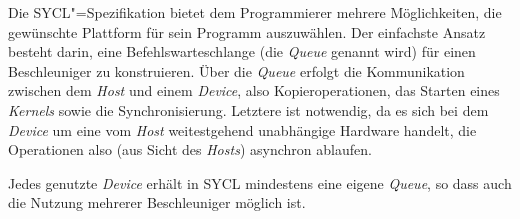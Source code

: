 Die SYCL"=Spezifikation bietet dem Programmierer mehrere Möglichkeiten, die
gewünschte Plattform für sein Programm auszuwählen. Der einfachste Ansatz
besteht darin, eine Befehlswarteschlange (die \textit{Queue} genannt wird) für
einen Beschleuniger zu konstruieren. Über die \textit{Queue} erfolgt die
Kommunikation zwischen dem \textit{Host} und einem \textit{Device}, also
Kopieroperationen, das Starten eines \textit{Kernels} sowie die
Synchronisierung. Letztere ist notwendig, da es sich bei dem \textit{Device}
um eine vom \textit{Host} weitestgehend unabhängige Hardware handelt, die
Operationen also (aus Sicht des \textit{Hosts}) asynchron ablaufen.

Jedes genutzte \textit{Device} erhält in SYCL mindestens eine eigene
\textit{Queue}, so dass auch die Nutzung mehrerer Beschleuniger möglich ist.

